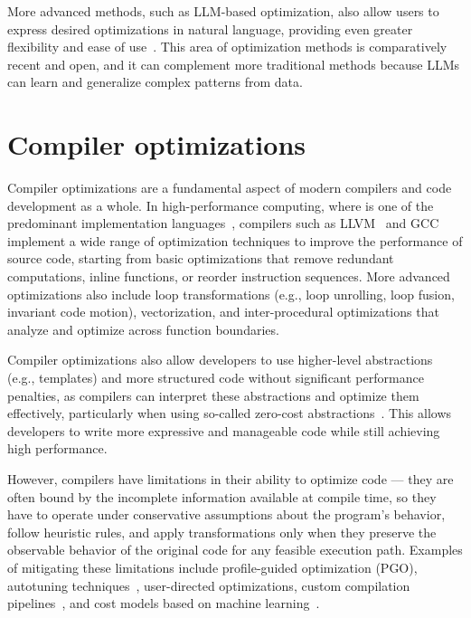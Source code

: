 More advanced methods, such as LLM-based optimization, also allow users to express desired optimizations in natural language, providing even greater flexibility and ease of use~\cite{mahmud2023autoparllm,merouani2025agentic}. This area of optimization methods is comparatively recent and open, and it can complement more traditional methods because LLMs can learn and generalize complex patterns from data.


\section{Compiler optimizations}

Compiler optimizations are a fundamental aspect of modern compilers and code development as a whole. In high-performance computing, where \cpp is one of the predominant implementation languages~\cite{laguna2019large}, compilers such as LLVM~\cite{lattner2004llvm} and GCC~\cite{gcc} implement a wide range of optimization techniques to improve the performance of source code, starting from basic optimizations that remove redundant computations, inline functions, or reorder instruction sequences. More advanced optimizations also include loop transformations (e.g., loop unrolling, loop fusion, invariant code motion), vectorization, and inter-procedural optimizations that analyze and optimize across function boundaries.

Compiler optimizations also allow developers to use higher-level abstractions (e.g., \cpp templates) and more structured code without significant performance penalties, as compilers can interpret these abstractions and optimize them effectively, particularly when using so-called zero-cost abstractions~\cite{stroustrup2012foundations}. This allows developers to write more expressive and manageable code while still achieving high performance.

However, compilers have limitations in their ability to optimize code --- they are often bound by the incomplete information available at compile time, so they have to operate under conservative assumptions about the program's behavior, follow heuristic rules, and apply transformations only when they preserve the observable behavior of the original code for any feasible execution path.
Examples of mitigating these limitations include profile-guided optimization (PGO), autotuning techniques~\cite{ansel2014opentuner}, user-directed optimizations, custom compilation pipelines~\cite{kruse2018user}, and cost models based on machine learning~\cite{baghdadi2021deep}.


